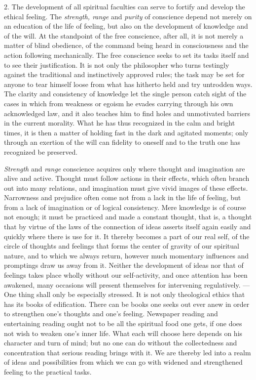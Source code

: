 \documentclass[12pt,a4paper,openany]{book}
\newcommand{\opage}[1]{\marginnote{\footnotesize\textit{[#1]}}}
\begin{document}
2. The development of all spiritual faculties can serve to fortify and develop the ethical feeling. The
\textit{strength, range} and \textit{purity} of conscience depend not merely on an education of the life of
feeling, but also on the development of knowledge and of the will. At the standpoint of the free conscience, after
all, it is not merely a matter of blind obedience, of the command being heard in consciousness and the action
following mechanically. The free conscience seeks to set its tasks itself and to see their justification. It is
not only the philosopher who turns testingly against the traditional and instinctively approved rules; the task
may be set for anyone to tear himself loose from what has hitherto held and
\opage{193}try untrodden ways. The clarity and consistency of knowledge let the single person catch sight of the
cases in which from weakness or egoism he evades carrying through his own acknowledged law, and it also teaches
him to find holes and unmotivated barriers in the current morality. What he has thus recognized in the calm and
bright times, it is then a matter of holding fast in the dark and agitated moments; only through an exertion of
the will can fidelity to oneself and to the truth one has recognized be preserved.

\textit{Strength} and \textit{range} conscience acquires only where thought and imagination are alive and active.
Thought must follow actions in their effects, which often branch out into many relations, and imagination must
give vivid images of these effects. Narrowness and prejudice often come not from a lack in the life of feeling,
but from a lack of imagination or of logical consistency. Mere knowledge is of course not enough; it must be
practiced and made a constant thought, that is, a thought that by virtue of the laws of the connection of ideas
asserts itself again easily and quickly where there is use for it. It thereby becomes a part of our real self,
of the circle of thoughts and feelings that forms the center of gravity of our spiritual nature, and to which we
always return, however much momentary influences and promptings draw us away from it. Neither the development of
ideas nor that of feelings takes place wholly without our self-activity, and once attention has been awakened,
many occasions will present themselves for intervening regulatively. --- One thing shall only be especially
stressed. It is not only theological ethics that has its books of edification. There can be books one seeks out
ever anew in order to strengthen one's thoughts and one's feeling. Newspaper reading and entertaining reading
ought not to be all the spiritual food one gets, if one does not wish to weaken one's inner life. What each will
choose here depends on his character and turn of mind; but no one can do without the collectedness and
concentration that serious reading brings with it. We are thereby led into a realm of ideas and possibilities
from which we can go with widened and strengthened feeling to the practical tasks.
\end{document}

